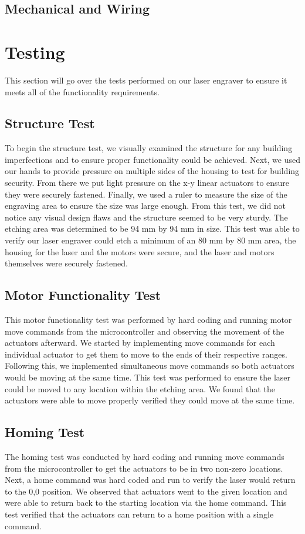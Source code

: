 \documentclass[11pt]{LaTeX-Classes/math-hw}
\begin{document}
\subsection{Mechanical and Wiring}

\section{Testing}
This section will go over the tests performed on our laser engraver to ensure it meets all of the functionality requirements. 

\subsection{Structure Test}
To begin the structure test, we visually examined the structure for any building imperfections and to ensure proper functionality could be achieved. Next, we used our hands to provide pressure on multiple sides of the housing to test for building security. From there we put light pressure on the x-y linear actuators to ensure they were securely fastened. Finally, we used a ruler to measure the size of the engraving area to ensure the size was large enough. From this test, we did not notice any visual design flaws and the structure seemed to be very sturdy. The etching area was determined to be 94 mm by 94 mm in size. This test was able to verify our laser engraver could etch a minimum of an 80 mm by 80 mm area, the housing for the laser and the motors were secure, and the laser and motors themselves were securely fastened.

\subsection{Motor Functionality Test}
This motor functionality test was performed by hard coding and running motor move commands from the microcontroller and observing the movement of the actuators afterward. We started by implementing move commands for each individual actuator to get them to move to the ends of their respective ranges. Following this, we implemented simultaneous move commands so both actuators would be moving at the same time. This test was performed to ensure the laser could be moved to any location within the etching area. We found that the actuators were able to move properly verified they could move at the same time. 

\subsection{Homing Test}
The homing test was conducted by hard coding and running move commands from the microcontroller to get the actuators to be in two non-zero locations. Next, a home command was hard coded and run to verify the laser would return to the 0,0 position. We observed that actuators went to the given location and were able to return back to the starting location via the home command. This test verified that the actuators can return to a home position with a single command.  
\end{document}
